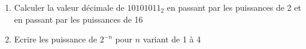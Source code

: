 \documentclass[a4paper,11pt]{article}
\begin{document}
\begin{enumerate}
%

\item{Calculer la valeur décimale de $10101011_2$ en passant par les puissances de 2 et en passant par les puissances de 16}\\


\item{Ecrire les puissance de $2^{-n}$ pour $n$ variant de 1 à 4}\\
%
%
%

\end{enumerate}
\end{document}
